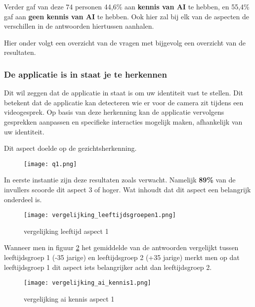 Verder gaf van deze 74 personen 44,6\% aan \textbf{kennis van AI} te hebben, en 55,4\% gaf aan \textbf{geen kennis van AI} te hebben. Ook hier zal bij elk van de aspecten de verschillen in de antwoorden hiertussen aanhalen.

Hier onder volgt een overzicht van de vragen met bijgevolg een overzicht van de resultaten.

\newpage

\subsubsection{De applicatie is in staat je te herkennen}

Dit wil zeggen dat de applicatie in staat is om uw identiteit vast te stellen. Dit betekent dat de applicatie kan detecteren wie er voor de camera zit tijdens een videogesprek. Op basis van deze herkenning kan de applicatie vervolgens gesprekken aanpassen en specifieke interacties mogelijk maken, afhankelijk van uw identiteit.

Dit aspect doelde op de gezichtsherkenning.

\begin{figure}[htbp]
    \centering
    \texttt{[image: q1.png]}
    \label{fig:vraag_1_resultaat}
\end{figure}

In eerste instantie zijn deze resultaten zoals verwacht. Namelijk \textbf{89\%} van de invullers scoorde dit aspect 3 of hoger. Wat inhoudt dat dit aspect een belangrijk onderdeel is.

\begin{figure}[htbp]
    \centering
    \texttt{[image: vergelijking\_leeftijdsgroepen1.png]}
    \caption{vergelijking leeftijd aspect 1}
    \label{fig:vergelijking_leeftijd1}
\end{figure}

Wanneer men in figuur \ref{fig:vergelijking_leeftijd1} het gemiddelde van de antwoorden vergelijkt tussen leeftijdsgroep 1 (-35 jarige) en leeftijdsgroep 2 (+35 jarige) merkt men op dat leeftijdsgroep 1 dit aspect iets belangrijker acht dan leeftijdsgroep 2.

\begin{figure}[htbp]
    \centering
    \texttt{[image: vergelijking\_ai\_kennis1.png]}
    \caption{vergelijking ai kennis aspect 1}
    \label{fig:vergelijking_ai_kennis1}
\end{figure}


